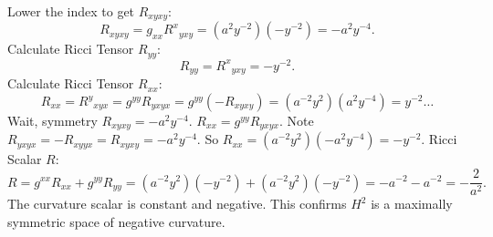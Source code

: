 \documentclass[11pt, a4paper]{report}
\begin{document}
Lower the index to get $R_{xyxy}$:
\begin{equation}
R_{xyxy} = g_{xx} {R^x}_{yxy} = (a^2 y^{-2}) (-y^{-2}) = -a^2 y^{-4}.
\end{equation}
Calculate Ricci Tensor $R_{yy}$:
\begin{equation}
R_{yy} = {R^x}_{yxy} = -y^{-2}.
\end{equation}
Calculate Ricci Tensor $R_{xx}$:
\begin{equation}
R_{xx} = {R^y}_{xyx} = g^{yy} R_{yxyx} = g^{yy} (-R_{xyxy}) = (a^{-2} y^2) (a^2 y^{-4}) = y^{-2} \dots
\end{equation}
Wait, symmetry $R_{xyxy} = -a^2 y^{-4}$.
$R_{xx} = g^{yy} R_{yxyx}$. Note $R_{yxyx} = -R_{xyyx} = R_{xyxy} = -a^2 y^{-4}$.
So $R_{xx} = (a^{-2} y^2) (-a^2 y^{-4}) = -y^{-2}$.
Ricci Scalar $R$:
\begin{equation}
R = g^{xx} R_{xx} + g^{yy} R_{yy} = (a^{-2} y^2)(-y^{-2}) + (a^{-2} y^2)(-y^{-2}) = -a^{-2} - a^{-2} = -\frac{2}{a^2}.
\end{equation}
The curvature scalar is constant and negative. This confirms $H^2$ is a maximally symmetric space of negative curvature.
\end{document}

